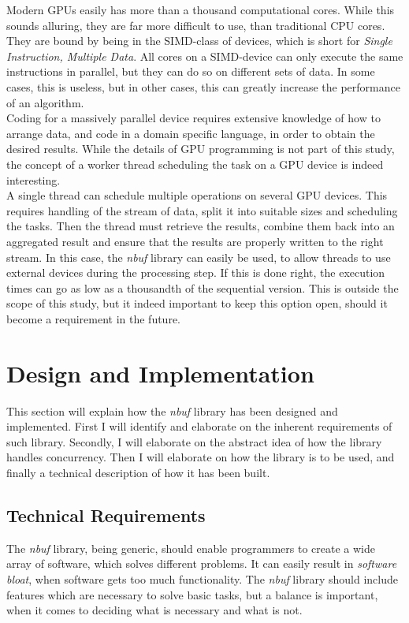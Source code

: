 \documentclass[a4paper]{article}
\newcommand{\nbuf}{\textit{nbuf} }
\begin{document}
Modern GPUs easily has more than a thousand computational cores. While this sounds alluring, they are far more difficult to use, than traditional CPU cores. They are bound by being in the SIMD-class of devices, which is short for \textit{Single Instruction, Multiple Data}. All cores on a SIMD-device can only execute the same instructions in parallel, but they can do so on different sets of data. In some cases, this is useless, but in other cases, this can greatly increase the performance of an algorithm.\\

Coding for a massively parallel device requires extensive knowledge of how to arrange data, and code in a domain specific language, in order to obtain the desired results. While the details of GPU programming is not part of this study, the concept of a worker thread scheduling the task on a GPU device is indeed interesting.\\

A single thread can schedule multiple operations on several GPU devices. This requires handling of the stream of data, split it into suitable sizes and scheduling the tasks. Then the thread must retrieve the results, combine them back into an aggregated result and ensure that the results are properly written to the right stream. In this case, the \nbuf library can easily be used, to allow threads to use external devices during the processing step. If this is done right, the execution times can go as low as a thousandth of the sequential version. This is outside the scope of this study, but it indeed important to keep this option open, should it become a requirement in the future.





\newpage
\section{Design and Implementation}
This section will explain how the \nbuf library has been designed and implemented. First I will identify and elaborate on the inherent requirements of such library. Secondly, I will elaborate on the abstract idea of how the library handles concurrency. Then I will elaborate on how the library is to be used, and finally a technical description of how it has been built.


\subsection{Technical Requirements}
The \nbuf library, being generic, should enable programmers to create a wide array of software, which solves different problems. It can easily result in \textit{software bloat}, when software gets too much functionality. The \nbuf library should include features which are necessary to solve basic tasks, but a balance is important, when it comes to deciding what is necessary and what is not.
\end{document}
